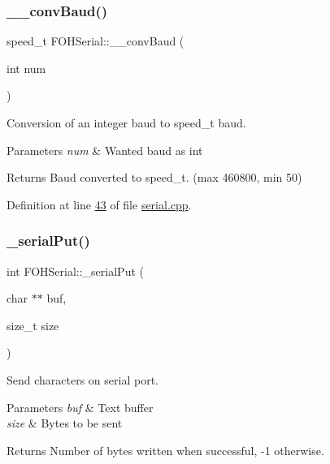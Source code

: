 \subsubsection{\texorpdfstring{\+\_\+\+\_\+conv\+Baud()}{\_\_convBaud()}}
{\footnotesize\ttfamily speed\+\_\+t F\+O\+H\+Serial\+::\+\_\+\+\_\+conv\+Baud (\begin{DoxyParamCaption}\item[{int}]{num }\end{DoxyParamCaption})\hspace{0.3cm}{\ttfamily [private]}}



Conversion of an integer baud to speed\+\_\+t baud. 


\begin{DoxyParams}{Parameters}
{\em num} & Wanted baud as int\\
\hline
\end{DoxyParams}
\begin{DoxyReturn}{Returns}
Baud converted to speed\+\_\+t. (max 460800, min 50) 
\end{DoxyReturn}


Definition at line \mbox{\hyperlink{serial_8cpp_source_l00043}{43}} of file \mbox{\hyperlink{serial_8cpp_source}{serial.\+cpp}}.

\mbox{\label{classFOHSerial_add9b2e556b56459b2eddc9b71f5c80ed}} 
\subsubsection{\texorpdfstring{\+\_\+serial\+Put()}{\_serialPut()}}
{\footnotesize\ttfamily int F\+O\+H\+Serial\+::\+\_\+serial\+Put (\begin{DoxyParamCaption}\item[{char $\ast$$\ast$}]{buf,  }\item[{size\+\_\+t}]{size }\end{DoxyParamCaption})\hspace{0.3cm}{\ttfamily [private]}}



Send characters on serial port. 


\begin{DoxyParams}{Parameters}
{\em buf} & Text buffer \\
\hline
{\em size} & Bytes to be sent\\
\hline
\end{DoxyParams}
\begin{DoxyReturn}{Returns}
Number of bytes written when successful, -\/1 otherwise. 
\end{DoxyReturn}


